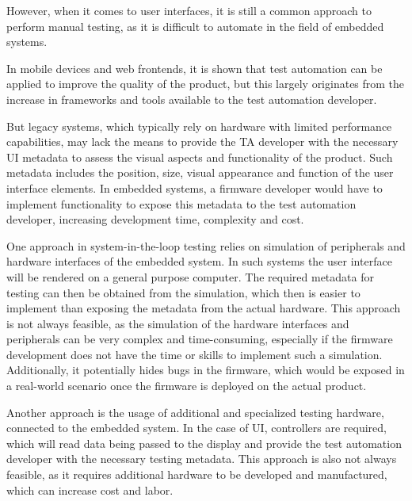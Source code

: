 \documentclass[Proposal,BIC,english,IEEE]{BASE/twbook} %
\begin{document}
However, when it comes to user interfaces, it is still a common approach to perform manual testing, as it is difficult to automate in the field of embedded systems.

In mobile devices and web frontends, it is shown that test automation can be applied to improve the quality of the product, but this largely originates from the increase in frameworks and tools available to the test automation developer.

But legacy systems, which typically rely on hardware with limited performance capabilities, may lack the means to provide the TA developer with the necessary UI metadata to assess the visual aspects and functionality of the product. Such metadata includes the position, size, visual appearance and function of the user interface elements. In embedded systems, a firmware developer would have to implement functionality to expose this metadata to the test automation developer, increasing development time, complexity and cost.

One approach in system-in-the-loop testing relies on simulation of peripherals and hardware interfaces of the embedded system. In such systems the user interface will be rendered on a general purpose computer. The required metadata for testing can then be obtained from the simulation, which then is easier to implement than exposing the metadata from the actual hardware.
This approach is not always feasible, as the simulation of the hardware interfaces and peripherals can be very complex and time-consuming, especially if the firmware development does not have the time or skills to implement such a simulation. Additionally, it potentially hides bugs in the firmware, which would be exposed in a real-world scenario once the firmware is deployed on the actual product.

Another approach is the usage of additional and specialized testing hardware, connected to the embedded system. In the case of UI, controllers are required, which will read data being passed to the display and provide the test automation developer with the necessary testing metadata. This approach is also not always feasible, as it requires additional hardware to be developed and manufactured, which can increase cost and labor.
\end{document}
